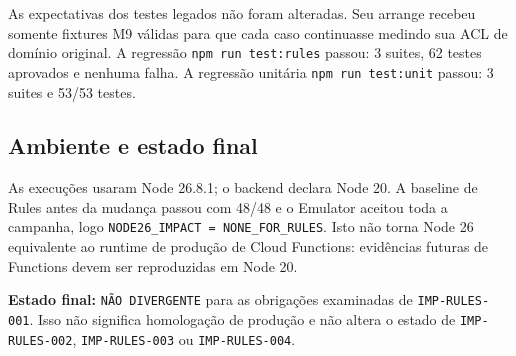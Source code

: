As expectativas dos testes legados não foram alteradas. Seu arrange recebeu
somente fixtures M9 válidas para que cada caso continuasse medindo sua ACL de
domínio original. A regressão \texttt{npm run test:rules} passou: 3 suites,
62 testes aprovados e nenhuma falha. A regressão unitária
\texttt{npm run test:unit} passou: 3 suites e 53/53 testes.

\subsection{Ambiente e estado final}

As execuções usaram Node 26.8.1; o backend declara Node 20. A baseline de Rules
antes da mudança passou com 48/48 e o Emulator aceitou toda a campanha, logo
\texttt{NODE26\_IMPACT = NONE\_FOR\_RULES}. Isto não torna Node 26 equivalente
ao runtime de produção de Cloud Functions: evidências futuras de Functions
devem ser reproduzidas em Node 20.

\textbf{Estado final:} \texttt{NÃO DIVERGENTE} para as obrigações examinadas de
\texttt{IMP-RULES-001}. Isso não significa homologação de produção e não altera
o estado de \texttt{IMP-RULES-002}, \texttt{IMP-RULES-003} ou
\texttt{IMP-RULES-004}.
